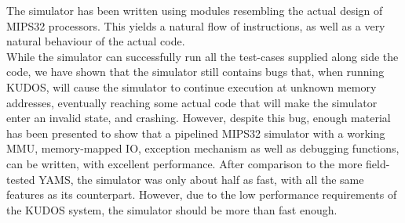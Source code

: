 The simulator has been written using modules resembling the actual design of
MIPS32 processors. This yields a natural flow of instructions, as well as a very natural
behaviour of the actual code.\\
While the simulator can successfully run all the test-cases supplied along side
the code, we have shown that the simulator still contains bugs that, when running
KUDOS, will cause the simulator to continue execution at unknown memory addresses,
eventually reaching some actual code that will make the simulator enter an invalid
state, and crashing. However, despite this bug, enough material has been presented
to show that a pipelined MIPS32 simulator with a working MMU, memory-mapped IO,
exception mechanism as well as debugging functions, can be written, with excellent
performance. After comparison to the more field-tested YAMS, the simulator was
only about half as fast, with all the same features as its counterpart. However,
due to the low performance requirements of the KUDOS system, the simulator should
be more than fast enough.



